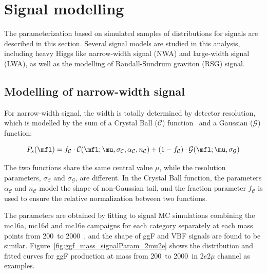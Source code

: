 \section{Signal modelling}

The parameterization based on simulated samples of \mfl distributions for signals are described in this section.
Several signal models are studied in this analysis, including heavy Higgs like narrow-width signal (NWA) and large-width signal (LWA), as well as the modelling of Randall-Sundrum graviton (RSG) signal.

\subsection{Modelling of narrow-width signal}

For narrow-width signal, the \mfl width is totally determined by detector resolution, which is modelled 
by the sum of a Crystal Ball ($\mathcal{C}$) function~\cite{CrystalBall1,CrystalBall2} and a Gaussian ($\mathcal{G}$) function:

\begin{equation}
    \label{eq:cb_plus_g}
    P_{s} (\mfl) = f_{\mathcal{C}} \cdot \mathcal{C}(\mfl; \mu, \sigma_{\mathcal{C}}, \alpha_{\mathcal{C}}, n_{\mathcal{C}})
                   + (1 - f_{\mathcal{C}}) \cdot \mathcal{G}(\mfl; \mu, \sigma_{\mathcal{G}})
\end{equation}

The two functions share the same central value $\mu$, while the resolution parameters, $\sigma_{\mathcal{C}}$ and $\sigma_{\mathcal{G}}$, are different.
In the Crystal Ball function, the parameters $\alpha_{\mathcal{C}}$ and $n_{\mathcal{C}}$ model the shape of non-Gaussian tail,
and the fraction parameter $f_{\mathcal{C}}$ is used to ensure the relative normalization between two functions.

The parameters are obtained by fitting to signal MC simulations combining the mc16a, mc16d and mc16e campaigns for each category separately at each mass points from 200~\gev to 2000~\gev,
and the shape of ggF and VBF signals are found to be similar.
Figure~\ref{fig:ggf_mass_signalParam_2mu2e} shows the \mfl distribution and fitted curves for ggF production at mass from 200~\gev to 2000~\gev in 2$e$2$\mu$ channel as examples.

